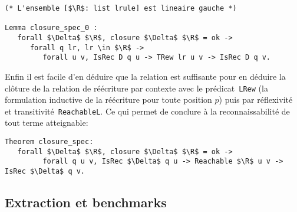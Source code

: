 \begin{lstlisting}
(* L'ensemble [$\R$: list lrule] est lineaire gauche *)

Lemma closure_spec_0 : 
   forall $\Delta$ $\R$, closure $\Delta$ $\R$ = ok ->
      forall q lr, lr \in $\R$ ->
         forall u v, IsRec D q u -> TRew lr u v -> IsRec D q v.
\end{lstlisting}
Enfin il est facile d'en déduire que la relation est suffisante 
pour en déduire la clôture de la relation de réécriture
par contexte avec le prédicat~\lstinline!LRew! (la formulation inductive de la réécriture pour toute position $p$)
puis par réflexivité et transitivité~\lstinline!ReachableL!. Ce qui permet de conclure
à la reconnaissabilité de tout terme atteignable: 

\begin{lstlisting}
Theorem closure_spec:
   forall $\Delta$ $\R$, closure $\Delta$ $\R$ = ok ->
         forall q u v, IsRec $\Delta$ q u -> Reachable $\R$ u v -> IsRec $\Delta$ q v.
\end{lstlisting}

\subsection{Extraction et benchmarks}
\label{sec:benchmarks}

